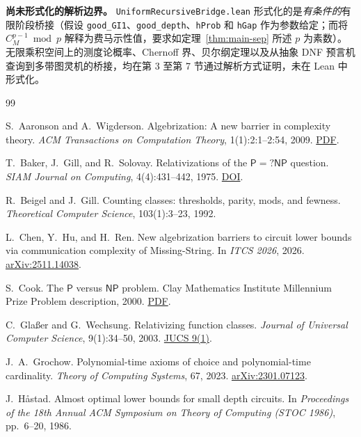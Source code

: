 \documentclass[11pt,a4paper]{article}
\theoremstyle{definition}
\theoremstyle{remark}
\newcommand{\Pcl}{\mathsf{P}}
\newcommand{\NP}{\mathsf{NP}}
\begin{document}
\textbf{尚未形式化的解析边界。} \texttt{UniformRecursiveBridge.lean} 形式化的是\emph{有条件的}有限阶段桥接（假设 \texttt{good\_GI1}、\texttt{good\_depth}、\texttt{hProb} 和 \texttt{hGap} 作为参数给定；而将 $C_M^{p-1}\bmod p$ 解释为费马示性值，要求如定理~\ref{thm:main-sep} 所述 $p$ 为素数）。无限乘积空间上的测度论概率、Chernoff 界、贝尔纲定理以及从抽象 DNF 预言机查询到多带图灵机的桥接，均在第 3 至第 7 节通过解析方式证明，未在 Lean 中形式化。

\begin{thebibliography}{99}\small\setlength{\itemsep}{1pt}\setlength{\parskip}{0pt}

S.~Aaronson and A.~Wigderson.
Algebrization: A new barrier in complexity theory.
\emph{ACM Transactions on Computation Theory}, 1(1):2:1--2:54, 2009.
\href{https://www.scottaaronson.com/papers/alg.pdf}{PDF}.

T.~Baker, J.~Gill, and R.~Solovay.
Relativizations of the $\Pcl = ?\NP$ question.
\emph{SIAM Journal on Computing}, 4(4):431--442, 1975.
\href{https://epubs.siam.org/doi/10.1137/0204037}{DOI}.

R.~Beigel and J.~Gill.
Counting classes: thresholds, parity, mods, and fewness.
\emph{Theoretical Computer Science}, 103(1):3--23, 1992.

L.~Chen, Y.~Hu, and H.~Ren.
New algebrization barriers to circuit lower bounds via communication complexity of Missing-String.
In \emph{ITCS 2026}, 2026.
\href{https://arxiv.org/abs/2511.14038}{arXiv:2511.14038}.

S.~Cook.
The $\Pcl$ versus $\NP$ problem.
Clay Mathematics Institute Millennium Prize Problem description, 2000.
\href{https://www.claymath.org/wp-content/uploads/2022/06/pvsnp.pdf}{PDF}.

C.~Gla\ss er and G.~Wechsung.
Relativizing function classes.
\emph{Journal of Universal Computer Science}, 9(1):34--50, 2003.
\href{https://lib.jucs.org/issue/4069/}{JUCS 9(1)}.

J.~A.~Grochow.
Polynomial-time axioms of choice and polynomial-time cardinality.
\emph{Theory of Computing Systems}, 67, 2023.
\href{https://arxiv.org/abs/2301.07123}{arXiv:2301.07123}.

J.~H\aa stad.
Almost optimal lower bounds for small depth circuits.
In \emph{Proceedings of the 18th Annual ACM Symposium on Theory of Computing (STOC 1986)}, pp.~6--20, 1986.


\end{thebibliography}
\end{document}
